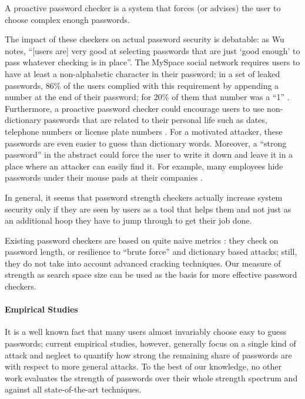 \documentclass[a4paper,twocolumn]{article}
\begin{document}
A proactive password checker is a system that forces (or advises)
the user to choose complex enough passwords.

The impact of these checkers on actual password security is debatable:
as Wu \cite{Wu1999RealWorld} notes, {}``{[}users are{]} very good
at selecting passwords that are just `good enough' to pass whatever
checking is in place''. The MySpace social network requires users
to have at least a non-alphabetic character in their password; in
a set of leaked passwords, 86\% of the users complied with this requirement
by appending a number at the end of their password; for 20\% of them
that number was a {}``1'' \cite{Porst2007Brief}. Furthermore, a
proactive password checker could encourage users to use non-dictionary
passwords that are related to their personal life such as dates, telephone
numbers or license plate numbers \cite{Adams1999Users}. For a motivated
attacker, these passwords are even easier to guess than dictionary
words. Moreover, a {}``strong password'' in the abstract could force
the user to write it down and leave it in a place where an attacker
can easily find it. For example, many employees hide passwords under
their mouse pads at their companies \cite{Smith2002Strong}.

In general, it seems that password strength checkers actually increase
system security only if they are seen by users as a tool that helps
them and not just as an additional hoop they have to jump through
to get their job done.

Existing password checkers are based on quite naive metrics \cite{Bishop1995Improving,Yan2001Note}:
they check on password length, or resilience to {}``brute force''
and dictionary based attacks; still, they do not take into account
advanced cracking techniques. Our measure of strength as search space
size can be used as the basis for more effective password checkers.


\paragraph{Empirical Studies}

It is a well known fact that many users almost invariably choose easy
to guess passwords; current empirical studies, however, generally
focus on a single kind of attack and neglect to quantify how strong
the remaining share of passwords are with respect to more general
attacks. To the best of our knowledge, no other work evaluates the
strength of passwords over their whole strength spectrum and against
all state-of-the-art techniques.
\end{document}
